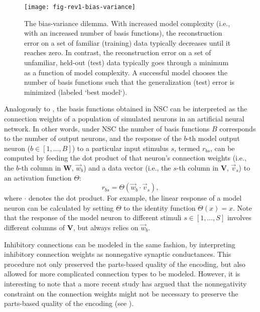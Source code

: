 \begin{figure}[h]
	\centering
	\texttt{[image: fig-rev1-bias-variance]}
    \caption{The bias-variance dilemma.
    With increased model complexity 
    (i.e., with an increased number of basis functions), 
    the reconstruction error on a set
    of familiar (training) data typically decreases until it reaches zero.
    In contrast, the reconstruction error on a set of unfamiliar, held-out
    (test) data typically goes through a minimum as a function of model complexity.
    A successful model chooses the number of basis functions such that the
    generalization (test) error is minimized (labeled `best model`).}
	\label{fig:nsc-bias-variance-dilemma}
\end{figure}

Analogously to \cite{OlshausenField1996,OlshausenField1997},
the basis functions obtained in \ac{NSC} can be interpreted as
the connection weights of a population of simulated neurons
in an artificial neural network.
In other words, under \ac{NSC} the number of basis functions $B$ 
corresponds to the number of output neurons, and the
response of the $b$-th model output neuron
($b \in [1, ..., B]$)
to a particular input stimulus $s$, termed $r_{bs}$,
can be computed by feeding the dot product of
that neuron's connection weights
(i.e., the $b$-th column in $\mathbf{W}$, $\vec{w}_b$)
and a data vector
(i.e., the $s$-th column in \textbf{V}, $\vec{v}_s$)
to an activation function $\Theta$:
\begin{equation}
r_{bs} = \Theta(\vec{w}_b \cdot \vec{v}_s),
\label{eqn:nsc-model-response}
\end{equation}
where $\cdot$ denotes the dot product.
For example, the linear response of a model neuron
can be calculated by setting $\Theta$ to the identity function $\Theta(x)=x$.
Note that the response of the model neuron to different stimuli 
$s \in [1, \ldots, S]$
involves different columns of \textbf{V},
but always relies on $\vec{w}_b$.

Inhibitory connections can be modeled in the same fashion,
by interpreting inhibitory connection weights
as nonnegative synaptic conductances.
This procedure not only preserved the parts-based quality of the encoding,
but also allowed for more complicated connection types to be modeled.
However, it is interesting to note that a more recent study has argued
that the nonnegativity constraint on the
connection weights might not be necessary 
to preserve the parts-based quality of the encoding (see \cite{Liu2017}).

